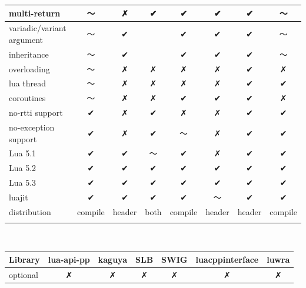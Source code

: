 \documentclass[conference,compsoc]{IEEEtran}
\begin{document}
\begin{table}[ht!]
\begin{tabular}{l c c c c c c c }
		\\ \hline
		multi-return              &      〜      &     ✗      &     ✔    &    ✔    &     ✔    &     ✔     &     〜     
		\\ \hline
		variadic/variant argument &      〜      &     ✔      &     ~    &    ✔    &     ✔    &     ✔     &     〜     
		\\ \hline
		inheritance               &      〜      &     ✔      &     ~    &    ✔    &     ✔    &     ✔     &     〜     
		\\ \hline
		overloading               &      〜      &     ✗      &     ✗    &    ✗    &     ✗    &     ✔     &     ✗     
		\\ \hline
		lua thread                &      〜      &     ✗      &     ✗    &    ✗    &     ✗    &     ✔     &     ✔     
		\\ \hline
		coroutines                &      〜      &     ✗      &     ✗    &    ✔    &     ✔    &     ✔     &     ✗     
		\\ \hline
		no-rtti support           &      ✔      &     ✗      &     ✔    &    ✗    &     ✗    &     ✔     &     ✔     
		\\ \hline
		no-exception support      &      ✔      &     ✗      &     ✔    &    〜    &     ✗    &     ✔     &     ✔     
		\\ \hline
		Lua 5.1                   &      ✔      &     ✔      &     〜    &    ✔    &     ✗    &     ✔     &     ✔     
		\\ \hline
		Lua 5.2                   &      ✔      &     ✔      &     ✔    &    ✔    &     ✔    &     ✔     &     ✔     
		\\ \hline
		Lua 5.3                   &      ✔      &     ✔      &     ✔    &    ✔    &     ✔    &     ✔     &     ✔     
		\\ \hline
		luajit                    &      ✔      &     ✔      &     ✔    &    ✔    &     〜    &     ✔     &     ✔     
		\\ \hline
		distribution              &   compile   &    header  &   both   & compile &  header  &   header  &  compile 
		\\ \hline \\
	\end{tabular}
	\\
	\begin{tabular}{l c c c c c c }
		Library                   &   lua-api-pp   &  kaguya  &    SLB   &    SWIG   & luacppinterface & luwra
		\\ \hline \hline
		optional                  &        ✗       &     ✗    &     ✗    &     ✗     &        ✗        &    ✗

\end{tabular}
\end{table}
\end{document}
